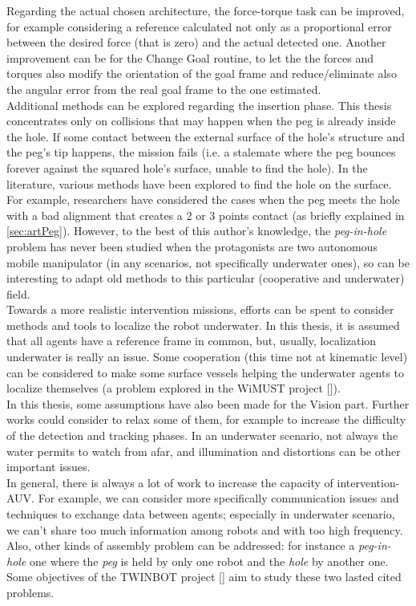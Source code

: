Regarding the actual chosen architecture, the force-torque task can be improved, for example considering a reference calculated not only as a proportional error between the desired force (that is zero) and the actual detected one. Another improvement can be for the Change Goal routine, to let the the forces and torques also modify the orientation of the goal frame and reduce/eliminate also the angular error from the real goal frame to the one estimated.\\

Additional methods can be explored regarding the insertion phase. This thesis concentrates only on collisions that may happen when the peg is already inside the hole. If some contact between the external surface of the hole's structure and the peg's tip happens, the mission fails (i.e. a stalemate where the peg bounces forever against the squared hole's surface, unable to find the hole). In the literature, various methods have been explored to find the hole on the surface. For example, researchers have considered the cases when the peg meets the hole with a bad alignment that creates a 2 or 3 points contact (as briefly explained in \ref{sec:artPeg}). However, to the best of this author's knowledge, the \textit{peg-in-hole} problem has never been studied when the protagonists are two autonomous mobile manipulator (in any scenarios, not specifically underwater ones), so can be interesting to adapt old methods to this particular (cooperative and underwater) field.\\

Towards a more realistic intervention missions, efforts can be spent to consider methods and tools to localize the robot underwater. In this thesis, it is assumed that all agents have a reference frame in common, but, usually, localization underwater is really an issue. Some cooperation (this time not at kinematic level) can be considered to make some surface vessels helping the underwater agents to localize themselves (a problem explored in the WiMUST project [\cite{wimust}]).\\

In this thesis, some assumptions have also been made for the Vision part. Further works could consider to relax some of them, for example to increase the difficulty of the detection and tracking phases. In an underwater scenario, not always the water permits to watch from afar, and illumination and distortions can be other important issues.\\

In general, there is always a lot of work to increase the capacity of intervention-AUV. For example, we can consider more specifically communication issues and techniques to exchange data between agents; especially in underwater scenario, we can't share too much information among robots and with too high frequency. Also, other kinds of assembly problem can be addressed: for instance a \textit{peg-in-hole} one where the \textit{peg} is held by only one robot and the \textit{hole} by another one. Some objectives of the TWINBOT project [\cite{TWINBOT2019}] aim to study these two lasted cited problems.

